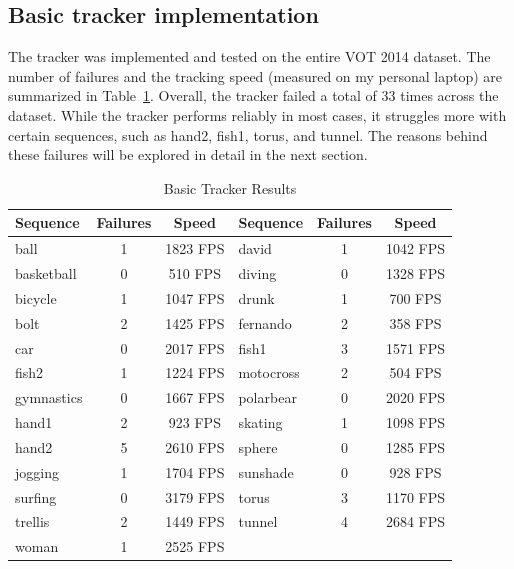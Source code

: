 \documentclass[9pt]{IEEEtran}
\begin{document}
\subsection{Basic tracker implementation}
The tracker was implemented and tested on the entire VOT 2014 dataset. 
The number of failures and the tracking speed (measured on my personal laptop)
 are summarized in Table~\ref{tab:basic_tracker_results}. Overall, the tracker 
 failed a total of 33 times across the dataset. While the tracker performs reliably
  in most cases, it struggles more with certain sequences, such as hand2, fish1,
   torus, and tunnel. The reasons behind these failures will be explored in detail in the next section. 

\begin{table}[h]
  \centering
  \caption{Basic Tracker Results}
  \setlength{\tabcolsep}{3pt}
  \begin{tabular}{l|c|c||l|c|c}
  \hline
  \textbf{Sequence} & \textbf{Failures} & \textbf{Speed} & \textbf{Sequence} & \textbf{Failures} & \textbf{Speed} \\ 
  \hline
  ball       & 1 & 1823 FPS & david     & 1 & 1042 FPS \\ 
  basketball & 0 & 510 FPS  & diving    & 0 & 1328 FPS \\ 
  bicycle    & 1 & 1047 FPS & drunk     & 1 & 700 FPS  \\ 
  bolt       & 2 & 1425 FPS & fernando  & 2 & 358 FPS  \\ 
  car        & 0 & 2017 FPS & fish1     & 3 & 1571 FPS \\ 
  fish2      & 1 & 1224 FPS & motocross & 2 & 504 FPS  \\ 
  gymnastics & 0 & 1667 FPS & polarbear & 0 & 2020 FPS \\ 
  hand1      & 2 & 923 FPS  & skating   & 1 & 1098 FPS \\ 
  hand2      & 5 & 2610 FPS & sphere    & 0 & 1285 FPS \\ 
  jogging    & 1 & 1704 FPS & sunshade  & 0 & 928 FPS  \\ 
  surfing    & 0 & 3179 FPS & torus     & 3 & 1170 FPS \\ 
  trellis    & 2 & 1449 FPS & tunnel    & 4 & 2684 FPS \\ 
  woman      & 1 & 2525 FPS &           &   &          \\ 
  \hline
  \end{tabular}
  \label{tab:basic_tracker_results}
  \end{table}
  
\end{document}
